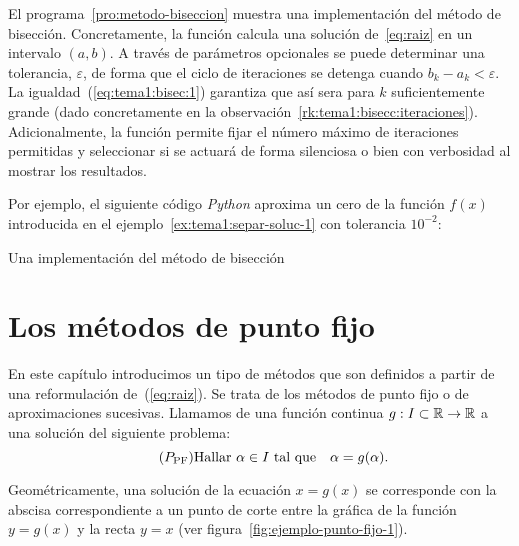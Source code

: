 \begin{test}
  El programa~\ref{pro:metodo-biseccion} muestra una implementación
  del método de bisección. Concretamente, la función
   calcula una solución
  de~\eqref{eq:raiz} en un intervalo $(a,b)$. A través de parámetros
  opcionales se puede determinar una tolerancia, $\varepsilon$, de
  forma que el ciclo de iteraciones se detenga cuando
  $b_k-a_k<\varepsilon$. La igualdad~(\ref{eq:tema1:bisec:1})
  garantiza que así sera para $k$ suficientemente grande (dado
  concretamente en la
  observación~\ref{rk:tema1:bisecc:iteraciones}). Adicionalmente, la
  función permite fijar el número máximo de iteraciones permitidas y
  seleccionar si se actuará de forma silenciosa o bien con
  verbosidad al mostrar los resultados.

  Por ejemplo, el siguiente código \textit{Python} aproxima un cero de
  la función $f(x)$ introducida en el
  ejemplo~\ref{ex:tema1:separ-soluc-1}
  con tolerancia $10^{-2}$:
  \begin{pythonoutput}
  \end{pythonoutput}
\end{test}


\begin{program}
  \caption{Una implementación del método de bisección}
  \label{pro:metodo-biseccion}
\end{program}

\section{Los métodos de punto fijo}
\label{sec:metodos-de-punto-fijo}

En este capítulo introducimos un tipo de métodos que son definidos a
partir de una reformulación de~(\ref{eq:raiz}). Se trata de los
métodos de punto fijo o de aproximaciones sucesivas.
Llamamos  de una función continua
$g:I\subset\operatorname{{\mathbb R}}\to\operatorname{{\mathbb R}}$ a una solución del siguiente  problema:
\begin{equation}
  \tag{$P_{\text{PF}}$}
  \text{Hallar $\cero\in I$ tal que} \quad \cero=g(\cero).
  \label{eq:punto-fijo}
\end{equation}

Geométricamente, una solución de la ecuación $x=g(x)$ se corresponde
con la abscisa correspondiente a un punto de corte entre la gráfica de
la función $y=g(x)$ y la recta $y=x$ (ver
figura~\ref{fig:ejemplo-punto-fijo-1}).

